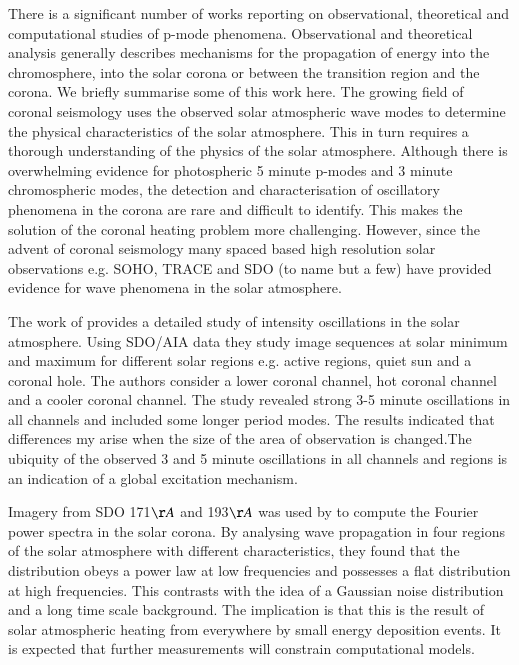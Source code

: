 \documentclass[authoryear,final,1p]{elsarticle}
\begin{document}
There is a significant number of works reporting on observational, theoretical and computational studies of p-mode phenomena. Observational and theoretical analysis generally describes mechanisms for the propagation of energy into the chromosphere, into the solar corona or between the transition region and the corona. We briefly summarise some of this work here. The growing field of coronal seismology uses the observed solar atmospheric wave modes to determine the physical characteristics of the solar atmosphere. This in turn requires a thorough understanding of the physics of the solar atmosphere. Although there is overwhelming evidence for photospheric 5 minute p-modes and 3 minute chromospheric modes, the detection and characterisation of oscillatory phenomena in the corona are rare and difficult to identify. This makes the solution of the coronal heating problem more challenging. However, since the advent of coronal seismology \citep[see e.g][]{Roberts1984, DeMoortel2005} many spaced based high resolution solar observations e.g. SOHO, TRACE and SDO (to name but a few) have provided evidence for wave phenomena in the solar atmosphere.

The work of \citet{Erdelyi2015} provides a detailed study of intensity oscillations in the solar atmosphere. Using SDO/AIA data they study image sequences at solar minimum and maximum for different solar regions e.g. active regions, quiet sun and a coronal hole. The authors consider a lower coronal channel, hot coronal channel and a cooler coronal channel. The study revealed strong 3-5 minute oscillations in all channels and included some longer period modes. The results indicated that differences my arise when the size of the area of observation is changed.The ubiquity of the observed 3 and 5 minute oscillations in all channels and regions is an indication of a global excitation mechanism.

Imagery from SDO 171$\AA$ and 193$\AA$ was used by \citet{Ireland2015} to compute the Fourier power spectra in the solar corona. By analysing wave propagation in four regions of the solar atmosphere with different characteristics, they found that the distribution obeys a power law at low frequencies and possesses a flat distribution at high frequencies. This contrasts with the idea of a Gaussian noise distribution and a long time scale background. The implication is that this is the result of solar atmospheric heating from everywhere by small energy deposition events. It is expected that further measurements will constrain computational models. 
\end{document}
